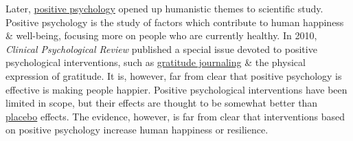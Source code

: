 \documentclass[oneside]{book}
\numberwithin{equation}{section}
\begin{document}
Later, \href{https://en.wikipedia.org/wiki/Positive_psychology}{positive psychology} opened up humanistic themes to scientific study. Positive psychology is the study of factors which contribute to human happiness \& well-being, focusing more on people who are currently healthy. In 2010, \textit{Clinical Psychological Review} published a special issue devoted to positive psychological interventions, such as \href{https://en.wikipedia.org/wiki/Gratitude_journal}{gratitude journaling} \& the physical expression of gratitude. It is, however, far from clear that positive psychology is effective is making people happier. Positive psychological interventions have been limited in scope, but their effects are thought to be somewhat better than \href{https://en.wikipedia.org/wiki/Placebo}{placebo} effects. The evidence, however, is far from clear that interventions based on positive psychology increase human happiness or resilience.
\end{document}
